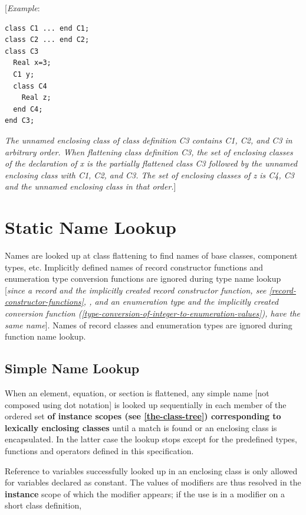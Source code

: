 \documentclass[10pt,a4paper]{report}
\def\doublelabel#1{\label{#1}}
\begin{document}
{[}\emph{Example}:
\begin{lstlisting}[language=Modelica]
class C1 ... end C1;
class C2 ... end C2;
class C3
  Real x=3;
  C1 y;
  class C4
    Real z;
  end C4;
end C3;
\end{lstlisting}

\emph{The unnamed enclosing class of class definition C3 contains C1,
C2, and C3 in arbitrary order. When flattening class definition C3, the
set of enclosing classes of the declaration of x is the partially
flattened class C3 followed by the unnamed enclosing class with C1, C2,
and C3. The set of enclosing classes of z is C4, C3 and the unnamed
enclosing class in that order.}{]}

\section{Static Name Lookup}\doublelabel{static-name-lookup}

Names are looked up at class flattening to find names of base classes,
component types, etc. Implicitly defined names of record constructor
functions and enumeration type conversion functions are ignored during
type name lookup {[}\emph{since a record and the implicitly created
record constructor function, see \ref{record-constructor-functions}, , and an
enumeration type and the implicitly created conversion function
(\ref{type-conversion-of-integer-to-enumeration-values}), have the same name}{]}. Names of record
classes and enumeration types are ignored during function name lookup.

\subsection{Simple Name Lookup}\doublelabel{simple-name-lookup}

When an element, equation, or section is flattened, any simple name
  {[}not composed using dot notation{]} is looked up sequentially in each
member of the ordered set \textbf{of instance scopes (see 
\ref{the-class-tree}) corresponding to lexically enclosing classes} until a
match is found or an enclosing class is encapsulated. In the latter case
the lookup stops except for the predefined types, functions and
operators defined in this specification.

Reference to variables successfully looked up in an enclosing class is
only allowed for variables declared as constant. The values of modifiers
are thus resolved in the \textbf{instance} scope of which the modifier
appears; if the use is in a modifier on a short class definition,
\end{document}
